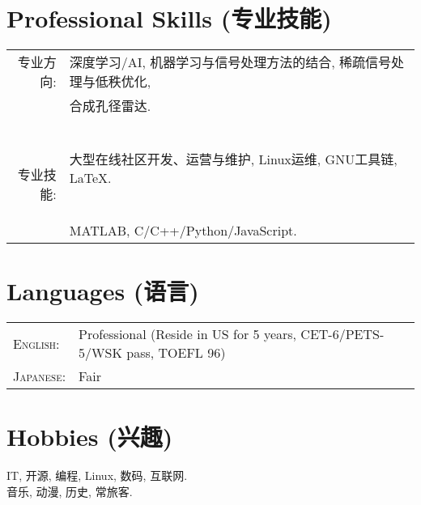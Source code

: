 \documentclass[paper=a4,fontsize=11pt]{scrartcl}
\begin{document}

\section*{Professional Skills (专业技能)}

\begin{tabular}{rl}
	
	专业方向: & 深度学习/AI, 机器学习与信号处理方法的结合, 稀疏信号处理与低秩优化,\\
	& 合成孔径雷达.\\
	
	~
	
	专业技能: & 大型在线社区开发、运营与维护, Linux运维, GNU工具链, \LaTeX.\\
	& MATLAB, C/C++/Python/JavaScript.
\end{tabular}

\section*{Languages (语言)}

\begin{tabular}{ll}
	
	\textsc{English:} & Professional (Reside in US for 5 years, CET-6/PETS-5/WSK pass, TOEFL 96) \\
	
	\textsc{Japanese:} & Fair\\
\end{tabular}


\section*{Hobbies (兴趣)}

IT, 开源, 编程, Linux, 数码, 互联网.\\
音乐, 动漫, 历史, 常旅客.\\
\end{document}
